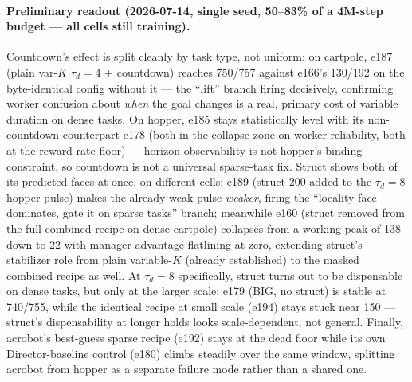 \documentclass[10pt]{article}
\begin{document}
\paragraph{Preliminary readout (2026-07-14, single seed, 50--83\% of a 4M-step
budget --- all cells still training).} Countdown's effect is split cleanly by
task type, not uniform: on cartpole, e187 (plain var-$K$ $\tau_d{=}4$ +
countdown) reaches 750/757 against e166's 130/192 on the byte-identical config
without it --- the ``lift'' branch firing decisively, confirming worker
confusion about \emph{when} the goal changes is a real, primary cost of
variable duration on dense tasks. On hopper, e185 stays statistically level
with its non-countdown counterpart e178 (both in the collapse-zone on worker
reliability, both at the reward-rate floor) --- horizon observability is not
hopper's binding constraint, so countdown is not a universal sparse-task fix.
Struct shows both of its predicted faces at once, on different cells: e189
(struct 200 added to the $\tau_d{=}8$ hopper pulse) makes the already-weak
pulse \emph{weaker}, firing the ``locality face dominates, gate it on sparse
tasks'' branch; meanwhile e160 (struct removed from the full combined recipe
on dense cartpole) collapses from a working peak of 138 down to 22 with
manager advantage flatlining at zero, extending struct's stabilizer role from
plain variable-$K$ (already established) to the masked combined recipe as
well. At $\tau_d{=}8$ specifically, struct turns out to be dispensable on
dense tasks, but only at the larger scale: e179 (BIG, no struct) is stable at
740/755, while the identical recipe at small scale (e194) stays stuck near
150 --- struct's dispensability at longer holds looks scale-dependent, not
general. Finally, acrobot's best-guess sparse recipe (e192) stays at the dead
floor while its own Director-baseline control (e180) climbs steadily over the
same window, splitting acrobot from hopper as a separate failure mode rather
than a shared one.
\end{document}
